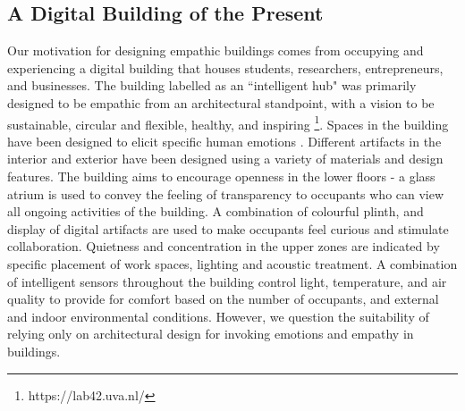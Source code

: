 \documentclass[manuscript, anonymous, review]{acmart}
\begin{document}
\subsection{A Digital Building of the Present}
\label{subsec:building}
Our motivation for designing empathic buildings comes from occupying and experiencing a digital building that houses students, researchers, entrepreneurs, and businesses. The building labelled as an ``intelligent hub" was primarily designed to be empathic from an architectural standpoint, with a vision to be sustainable, circular and flexible, healthy, and inspiring \footnote{https://lab42.uva.nl/}. Spaces in the building have been designed to elicit specific human emotions \cite{silo_michiel_2022}. Different artifacts in the interior and exterior have been designed using a variety of materials and design features. The building aims to encourage openness in the lower floors - a glass atrium is used to convey the feeling of transparency to occupants who can view all ongoing activities of the building.  A combination of colourful plinth, and display of digital artifacts are used to make occupants feel curious and stimulate collaboration. Quietness and concentration in the upper zones are indicated by specific placement of work spaces, lighting and acoustic treatment. A combination of intelligent sensors throughout the building control light, temperature, and air quality to provide for comfort based on the number of occupants, and external and indoor environmental conditions. However, we question the suitability of relying only on architectural design for invoking emotions and empathy in buildings. 
\end{document}

